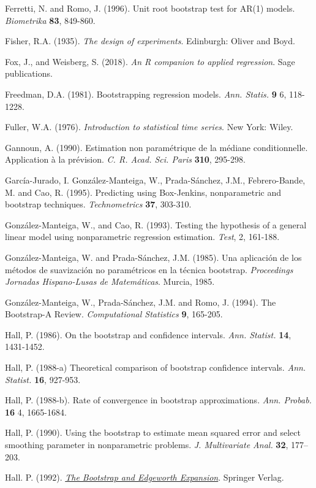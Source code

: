 \documentclass[
]{book}
\theoremstyle{break}
\theoremstyle{definition}
\theoremstyle{definition}
\theoremstyle{definition}
\theoremstyle{definition}
\theoremstyle{remark}
\begin{document}
Ferretti, N. and Romo, J. (1996). Unit root bootstrap test for AR(1)
models. \emph{Biometrika} \textbf{83}, 849-860.

Fisher, R.A. (1935). \emph{The design of experiments}. Edinburgh: Oliver and Boyd.

Fox, J., and Weisberg, S. (2018). \emph{An R companion to applied regression}. Sage publications.

Freedman, D.A. (1981). Bootstrapping regression models.
\emph{Ann. Statis.} \textbf{9} 6, 118-1228.

Fuller, W.A. (1976). \emph{Introduction to statistical time series}. New York:
Wiley.

Gannoun, A. (1990). Estimation non paramétrique de la médiane
conditionnelle. Application à la prévision. \emph{C. R. Acad. Sci. Paris}
\textbf{310}, 295-298.

García-Jurado, I. González-Manteiga, W., Prada-Sánchez, J.M.,
Febrero-Bande, M. and Cao, R. (1995). Predicting using Box-Jenkins,
nonparametric and bootstrap techniques. \emph{Technometrics} \textbf{37}, 303-310.

González-Manteiga, W., and Cao, R. (1993). Testing the hypothesis of a general linear model using nonparametric regression estimation. \emph{Test}, 2, 161-188.

González-Manteiga, W. and Prada-Sánchez, J.M. (1985). Una aplicación de
los métodos de suavización no paramétricos en la técnica bootstrap.
\emph{Proceedings Jornadas Hispano-Lusas de Matemáticas}. Murcia, 1985.

González-Manteiga, W., Prada-Sánchez, J.M. and Romo, J. (1994). The
Bootstrap-A Review. \emph{Computational Statistics} \textbf{9}, 165-205.

Hall, P. (1986). On the bootstrap and confidence intervals.
\emph{Ann. Statist.} \textbf{14}, 1431-1452.

Hall, P. (1988-a) Theoretical comparison of bootstrap confidence
intervals. \emph{Ann. Statist.} \textbf{16}, 927-953.

Hall, P. (1988-b). Rate of convergence in bootstrap approximations.
\emph{Ann. Probab.} \textbf{16} 4, 1665-1684.

Hall, P. (1990). Using the bootstrap to estimate mean squared error and
select smoothing parameter in nonparametric problems.
\emph{J. Multivariate Anal.} \textbf{32}, 177--203.

Hall. P. (1992). \href{https://books.google.es/books?hl=es\&lr=\&id=CwLaBwAAQBAJ\&oi=fnd\&pg=PR11\&dq=The+Bootstrap+and+Edgeworth+Expansion}{\emph{The Bootstrap and Edgeworth Expansion}}. Springer Verlag.
\end{document}
